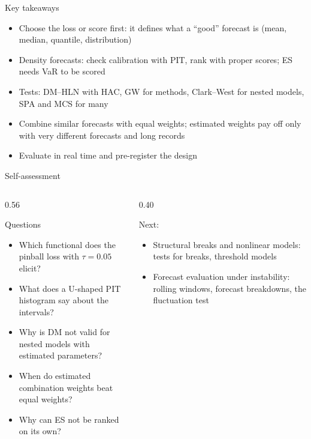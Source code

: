 \begin{frame}{Key takeaways}
\itemsize{\small}
\begin{itemize}
    \item Choose the loss or score first: it defines what a ``good'' forecast is (mean, median, quantile, distribution)
    \item Density forecasts: check calibration with PIT, rank with proper scores; ES needs VaR to be scored
    \item Tests: DM--HLN with HAC, GW for methods, Clark--West for nested models, SPA and MCS for many
    \item Combine similar forecasts with equal weights; estimated weights pay off only with very different forecasts and long records
    \item Evaluate in real time and pre-register the design
\end{itemize}
\end{frame}

\begin{frame}{Self-assessment}
\itemsize{\small}
\begin{columns}[T]
\begin{column}{0.56\textwidth}
\begin{block}{Questions}
\begin{itemize}
    \item Which functional does the pinball loss with $\tau = 0.05$ elicit?
    \item What does a U-shaped PIT histogram say about the intervals?
    \item Why is DM not valid for nested models with estimated parameters?
    \item When do estimated combination weights beat equal weights?
    \item Why can ES not be ranked on its own?
\end{itemize}
\end{block}
\end{column}
\begin{column}{0.40\textwidth}
\begin{block}{Next: }
\begin{itemize}
    \item Structural breaks and nonlinear models: tests for breaks, threshold models
    \item Forecast evaluation under instability: rolling windows, forecast breakdowns, the fluctuation test 
\end{itemize}
\end{block}
\end{column}
\end{columns}
\end{frame}


